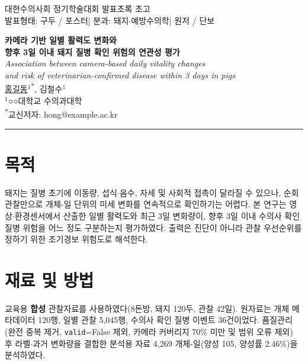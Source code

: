 \documentclass[10pt,a4paper]{article}
\newcommand{\presenter}[1]{\underline{#1}} %
\begin{document}
\begin{center}
{\footnotesize
대한수의사회 정기학술대회 발표초록 초고}\\[0.2em]
{\footnotesize
발표형태: 구두 / 포스터\quad|\quad
분과: 돼지$\cdot$예방수의학\quad|\quad
원저 / 단보}
\end{center}

\vspace{0.4em}

\begin{center}
{\large\bfseries
카메라 기반 일별 활력도 변화와\\
향후 3일 이내 돼지 질병 확인 위험의 연관성 평가}\\[0.55em]
{\normalsize\itshape
Association between camera-based daily vitality changes\\
and risk of veterinarian-confirmed disease within 3 days in pigs}\\[0.9em]
{\normalsize
\presenter{홍길동}$^{1}$\textsuperscript{*},\; 김철수$^{1}$}\\[0.35em]
{\small $^{1}$○○대학교 수의과대학}\\[0.25em]
{\small \textsuperscript{*}교신저자: hong@example.ac.kr}
\end{center}

\vspace{0.3em}
\begin{center}\rule{0.92\textwidth}{0.4pt}\end{center}

\section*{목\;적}
돼지는 질병 초기에 이동량, 섭식$\cdot$음수, 자세 및 사회적 접촉이 달라질 수 있으나, 순회 관찰만으로 개체-일 단위의 미세 변화를 연속적으로 확인하기는 어렵다. 본 연구는 영상$\cdot$환경센서에서 산출한 일별 활력도와 최근 3일 변화량이, 향후 3일 이내 수의사 확인 질병 위험을 어느 정도 구분하는지 평가하였다. 출력은 진단이 아니라 관찰 우선순위를 정하기 위한 조기경보 위험도로 해석한다.

\section*{재료 및 방법}
교육용 \textbf{합성} 관찰자료를 사용하였다(8돈방, 돼지 120두, 관찰 42일). 원자료는 개체 메타데이터 120행, 일별 관찰 5,045행, 수의사 확인 질병 이벤트 36건이었다. 품질관리(완전 중복 제거, \texttt{valid}=False 제외, 카메라 커버리지 70\% 미만 및 범위 오류 제외) 후 라벨$\cdot$과거 변화량을 결합한 분석용 자료 4,269 개체-일(양성 105, 양성률 2.46\%)을 분석하였다.
\end{document}
